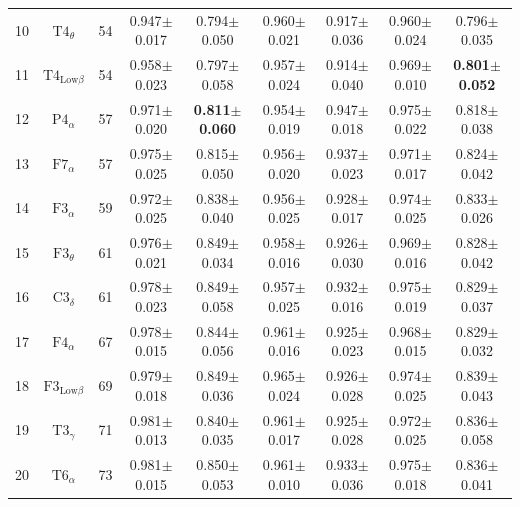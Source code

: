 \documentclass[pdflatex,sn-mathphys]{sn-jnl}%
\theoremstyle{thmstyleone}%
\theoremstyle{thmstyletwo}%
\theoremstyle{thmstylethree}%
\begin{document}
\begin{appendices}
\begin{table}[h!]
{\begin{tabular}{r|cccccccc}
  10 &            $\text{T4}_{\theta}$ &     54 &          0.947$\pm$0.017 &          0.794$\pm$0.050 &          0.960$\pm$0.021 &          0.917$\pm$0.036 &          0.960$\pm$0.024 &          0.796$\pm$0.035 \\
  11 &   $\text{T4}_{\text{Low}\beta}$ &     54 &          0.958$\pm$0.023 &          0.797$\pm$0.058 &          0.957$\pm$0.024 &          0.914$\pm$0.040 &          0.969$\pm$0.010 & \textbf{0.801$\pm$0.052} \\
  12 &            $\text{P4}_{\alpha}$ &     57 &          0.971$\pm$0.020 & \textbf{0.811$\pm$0.060} &          0.954$\pm$0.019 &          0.947$\pm$0.018 &          0.975$\pm$0.022 &          0.818$\pm$0.038 \\
  13 &            $\text{F7}_{\alpha}$ &     57 &          0.975$\pm$0.025 &          0.815$\pm$0.050 &          0.956$\pm$0.020 &          0.937$\pm$0.023 &          0.971$\pm$0.017 &          0.824$\pm$0.042 \\
  14 &            $\text{F3}_{\alpha}$ &     59 &          0.972$\pm$0.025 &          0.838$\pm$0.040 &          0.956$\pm$0.025 &          0.928$\pm$0.017 &          0.974$\pm$0.025 &          0.833$\pm$0.026 \\
  15 &            $\text{F3}_{\theta}$ &     61 &          0.976$\pm$0.021 &          0.849$\pm$0.034 &          0.958$\pm$0.016 &          0.926$\pm$0.030 &          0.969$\pm$0.016 &          0.828$\pm$0.042 \\
  16 &            $\text{C3}_{\delta}$ &     61 &          0.978$\pm$0.023 &          0.849$\pm$0.058 &          0.957$\pm$0.025 &          0.932$\pm$0.016 &          0.975$\pm$0.019 &          0.829$\pm$0.037 \\
  17 &            $\text{F4}_{\alpha}$ &     67 &          0.978$\pm$0.015 &          0.844$\pm$0.056 &          0.961$\pm$0.016 &          0.925$\pm$0.023 &          0.968$\pm$0.015 &          0.829$\pm$0.032 \\
  18 &   $\text{F3}_{\text{Low}\beta}$ &     69 &          0.979$\pm$0.018 &          0.849$\pm$0.036 &          0.965$\pm$0.024 &          0.926$\pm$0.028 &          0.974$\pm$0.025 &          0.839$\pm$0.043 \\
  19 &            $\text{T3}_{\gamma}$ &     71 &          0.981$\pm$0.013 &          0.840$\pm$0.035 &          0.961$\pm$0.017 &          0.925$\pm$0.028 &          0.972$\pm$0.025 &          0.836$\pm$0.058 \\
  20 &            $\text{T6}_{\alpha}$ &     73 &          0.981$\pm$0.015 &          0.850$\pm$0.053 &          0.961$\pm$0.010 &          0.933$\pm$0.036 &          0.975$\pm$0.018 &          0.836$\pm$0.041 \\

\end{tabular}}
\end{table}
\end{appendices}
\end{document}
